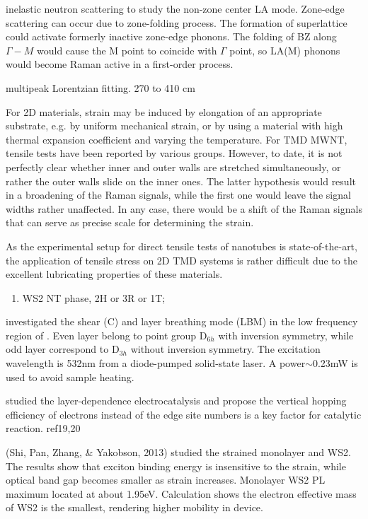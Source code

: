 inelastic neutron scattering to study the non-zone center LA mode. Zone-edge scattering can occur due to zone-folding process. The formation of superlattice could activate formerly inactive zone-edge phonons. The folding of BZ along $\Gamma-M$ would cause the M point to coincide with $\Gamma$ point, so LA(M) phonons would become Raman active in a first-order process.

multipeak Lorentzian fitting. 270 to 410 cm




For 2D materials, strain may be induced by elongation of an appropriate substrate, e.g. by uniform mechanical strain, or by using a material with high thermal expansion coefficient and varying the temperature. For TMD MWNT, tensile tests have been reported by various groups. However, to date, it is not perfectly clear whether inner and outer walls are stretched simultaneously, or rather the outer walls slide on the inner ones. The latter hypothesis would result in a broadening of the Raman signals, while the first one would leave the signal widths rather unaffected. In any case, there would be a shift of the Raman signals that can serve as precise scale for determining the strain.

As the experimental setup for direct tensile tests of nanotubes is state-of-the-art,\cite{Tang2013} the application of tensile stress on 2D TMD systems is rather difficult due to the excellent lubricating properties of these materials.

\begin{enumerate}
\item WS2 NT phase, 2H or 3R or 1T;

\end{enumerate}


\citeauthor{Zhang2013i} investigated the shear (C) and layer breathing mode (LBM) in the low frequency region of .\cite{Zhang2013i} Even layer  belong to point group D$_{6h}$ with inversion symmetry, while odd layer  correspond to D$_{3h}$ without inversion symmetry. The excitation wavelength is 532nm from a diode-pumped solid-state laser. A power$\sim$0.23mW is used to avoid sample heating.

\citeauthor{Cao2014} studied the layer-dependence  electrocatalysis and propose the vertical hopping efficiency of electrons instead of the edge site numbers is a key factor for catalytic reaction.\cite{Cao2014} ref19,20


(Shi, Pan, Zhang, \& Yakobson, 2013) studied the strained monolayer  and WS2. The results show that exciton binding energy is insensitive to the strain, while optical band gap becomes smaller as strain increases. Monolayer WS2 PL maximum located at about 1.95eV. Calculation shows the electron effective mass of WS2 is the smallest, rendering higher mobility in device.

